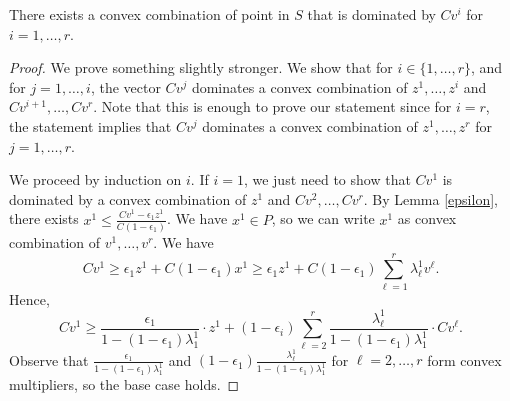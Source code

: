 \begin{lemma}\label{tightcutcomb}
	There exists a convex combination of point in $S$ that is dominated by $Cv^i$ for $i=1,\ldots,r$.
\end{lemma}
\begin{proof}
	
	
	We prove something slightly stronger. We show that for $i\in\{1,\ldots,r\}$, and for $j=1,\ldots,i$, the vector $Cv^j$ dominates  a convex combination of $z^1,\ldots,z^i$ and $Cv^{i+1},\ldots,Cv^r$. Note that this is enough to prove our statement since for $i=r$, the statement implies that $Cv^j$ dominates a convex combination of $z^1,\ldots,z^r$ for $j=1,\ldots,r$. 
	
	We proceed by induction on $i$. If $i=1$, we just need to show that $Cv^1$ is dominated by a convex combination of $z^1$ and $Cv^2,\ldots,Cv^r$. By Lemma \ref{epsilon}, there exists $x^1\leq  \frac{Cv^1-\epsilon_1z^1}{C(1-\epsilon_1)}$. We have $x^1\in P$, so we can write $x^1$ as convex combination of $v^1,\ldots, v^r$. We have
	\begin{equation*}
	Cv^1 \geq  \epsilon_1z^1 + C(1-\epsilon_1)x^1 \geq \epsilon_1z^1 + C(1-\epsilon_1) \sum_{\ell=1}^{r}\lambda^1_\ell v^\ell.
	\end{equation*}
	Hence,
	\begin{equation}\label{equation6}
	Cv^1 \geq \frac{\epsilon_1}{1-(1-\epsilon_1)\lambda^1_1}\cdot z^1 + (1-\epsilon_i)\sum_{\ell=2}^{r} \frac{\lambda^1_\ell}{1-(1-\epsilon_1)\lambda_1^1}\cdot Cv^\ell.
	\end{equation}
	Observe that $\frac{\epsilon_1}{1-(1-\epsilon_1)\lambda^1_1}$ and $(1-\epsilon_1)\frac{\lambda^1_\ell}{1-(1-\epsilon_1)\lambda_1^1}$ for $\ell=2,\ldots,r$ form convex multipliers, so the base case holds.
	

\end{proof}
